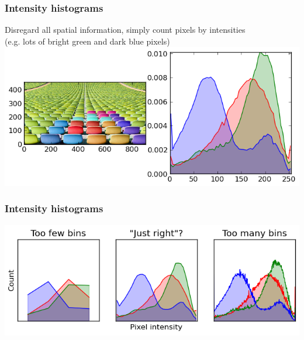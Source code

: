 \begin{frame}
  \frametitle{Intensity histograms}

  \begin{center}
    Disregard all spatial information, simply count pixels by intensities \\
    (e.g. lots of bright green and dark blue pixels)
    \vskip20pt
  \includegraphics[width=\textwidth]{../../code/image_data/chairs_64.png}
  \end{center}

\end{frame}


\begin{frame}
  \frametitle{Intensity histograms}

  \begin{center}
  \includegraphics[width=\textwidth]{chairs_hists.png}
  \end{center}

\end{frame}

